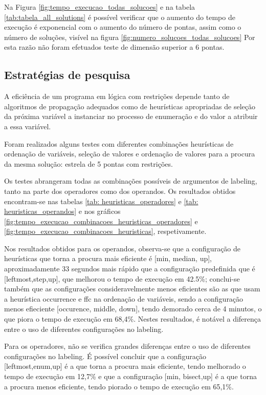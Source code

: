

Na Figura \ref{fig:tempo_execucao_todas_solucoes} e na tabela \ref{tab:tabela_all_solutions} é possível verificar que o aumento do tempo de execução é exponencial com o aumento do número de pontas, assim como o número de soluções, visível na figura \ref{fig:numero_solucoes_todas_solucoes} Por esta razão não foram efetuados teste de dimensão superior a 6 pontas.

\subsection{Estratégias de pesquisa}

A eficiência de um programa em lógica com restrições depende tanto de algoritmos de propagação adequados como de heurísticas apropriadas de seleção da próxima variável a instanciar no processo de enumeração e do valor a atribuir a essa variável.

Foram realizados alguns testes com diferentes combinações heurísticas de ordenação de variáveis, seleção de valores e ordenação de valores para a procura da mesma solução: estrela de 5 pontas com restrições.

Os testes abrangeram todas as combinações possíveis de argumentos de labeling, tanto na parte dos operadores como dos operandos. Os resultados obtidos encontram-se nas tabelas  \ref{tab: heuristicas_operadores} e \ref{tab: heuristicas_operandos}  e nos gráficos \ref{fig:tempo_execucao_combinacoes_heuristicas_operadores} e \ref{fig:tempo_execucao_combinacoes_heuristicas}, respetivamente.

 Nos resultados obtidos para os operandos, observa-se que a configuração de heurísticas que torna a procura mais eficiente é [min, median, up], aproximadamente 33 segundos mais rápido que a configuração predefinida que é [leftmost,step,up], que melhorou o tempo de execução em 42.5\%; conclui-se também que as configurações consideravelmente menos eficientes são as que usam a heurística occurrence e ffc na ordenação de variáveis,  sendo a configuração menos efieciente [occurence, middle, down], tendo demorado cerca de 4 minutos, o que piora o tempo de execução em 68,4\%. Nestes resultados, é notável a diferença entre o uso de diferentes configurações no labeling.
 
 
 Para os operadores, não se verifica grandes diferenças entre o uso de diferentes configurações no labeling. É possível concluir que a configuração [leftmost,enum,up] é a que torna a procura mais eficiente, tendo melhorado o tempo de execução em 12,7\% e que a configuração [min, bisect,up] é a que torna a procura menos eficiente, tendo piorado o tempo de execução em 65,1\%.
 
 
